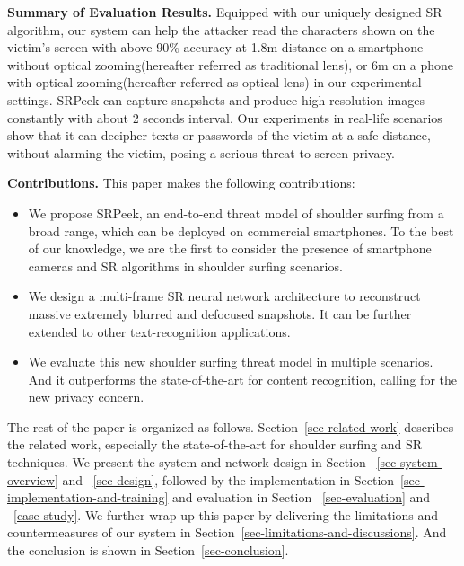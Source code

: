 \vspace{1mm}
\noindent
\textbf{Summary of Evaluation Results.}
Equipped with our uniquely designed SR algorithm, our system can help the attacker read the characters shown on the victim's screen with above 90\% accuracy at 1.8m distance on a smartphone without optical zooming(hereafter referred as traditional lens), or 6m on a phone with optical zooming(hereafter referred as optical lens) in our experimental settings. \textsf{SRPeek} can capture snapshots and produce high-resolution images constantly with about 2 seconds interval. Our experiments in real-life scenarios show that it can decipher texts or passwords of the victim at a safe distance, without alarming the victim, posing a serious threat to screen privacy.

\vspace{1mm}
\noindent
\textbf{Contributions.} This paper makes the following contributions:
\begin{itemize}[leftmargin=*]
  \item	We propose \textsf{SRPeek}, an end-to-end threat model of shoulder surfing from a broad range, which can be deployed on commercial smartphones. To the best of our knowledge, we are the first to consider the presence of smartphone cameras and SR algorithms in shoulder surfing scenarios.
  \item	We design a multi-frame SR neural network architecture to reconstruct massive extremely blurred and defocused snapshots. It can be further extended to other text-recognition applications.
  \item	We evaluate this new shoulder surfing threat model in multiple scenarios. And it outperforms the state-of-the-art for content recognition, calling for the new privacy concern.
\end{itemize}

\vspace{1mm}
The rest of the paper is organized as follows. Section~\ref{sec-related-work} describes the related work, especially the state-of-the-art for shoulder surfing and SR techniques. We present the system and network design in Section ~\ref{sec-system-overview} and ~\ref{sec-design}, followed by the implementation in Section~\ref{sec-implementation-and-training} and evaluation in Section ~\ref{sec-evaluation} and ~\ref{case-study}. We further wrap up this paper by delivering the limitations and countermeasures of our system in Section~\ref{sec-limitations-and-discussions}. And the conclusion is shown in Section~\ref{sec-conclusion}.
